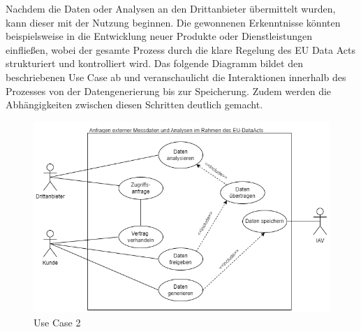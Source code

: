   \newline
  Nachdem die Daten oder Analysen an den Drittanbieter übermittelt wurden, kann dieser mit der Nutzung beginnen. Die gewonnenen Erkenntnisse könnten beispielsweise in die Entwicklung neuer Produkte oder Dienstleistungen einfließen, wobei der gesamte Prozess durch die klare Regelung des EU Data Acts strukturiert und kontrolliert wird.
  \newline
  Das folgende Diagramm bildet den beschriebenen Use Case ab und veranschaulicht die Interaktionen innerhalb des Prozesses von der Datengenerierung bis zur Speicherung. Zudem werden die Abhängigkeiten zwischen diesen Schritten deutlich gemacht.
  \begin{figure}[H]
      \centering
      \includegraphics[scale=.6]{media/UseCase2}
      \caption{Use Case 2}
      \label{fig:UseCase2}
  \end{figure}
\newpage
